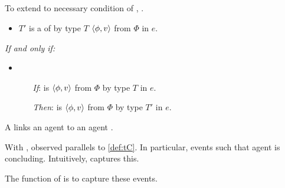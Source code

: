 \subsection{}
\label{sec:rotoc}

\begin{note}
  To extend \ptC{} to necessary condition of \tC{}, \rotoc{}.
\end{note}

\begin{note}
  \begin{definition}[A \rotoc{}]
    \label{def:rotoc}
    \newline

    \begin{itemize}
    \item
      \(T'\) is a \emph{\tRep{}} of \vAgent{} \tCV{} by type \(T\) \(\langle \phi, v \rangle\) from \(\Phi\) in \(e\).
    \end{itemize}

    \emph{If and only if:}

    \begin{itemize}
    \item
      \begin{itemize}
      \item[\emph{If}:]
        \vAgent{} is \tCV{} \(\langle \phi, v \rangle\) from \(\Phi\) by type \(T\) in \(e\).
      \item[\emph{Then}:]
        \vAgent{} is \ptCV{} \(\langle \phi, v \rangle\) from \(\Phi\) by type \(T'\) in \(e\).
      \end{itemize}
    \end{itemize}
    \vspace{-\baselineskip}
  \end{definition}

  \noindent%
  A \rotoc{} links an agent \ptCV{} to an agent \tCV{}.

  With \ptCV{}, observed parallels to \autoref{def:tC}.
  In particular, events such that agent is concluding.
  Intuitively, \rotoc{} captures this.

  The function of \rotoc{} is to capture these events.
\end{note}

